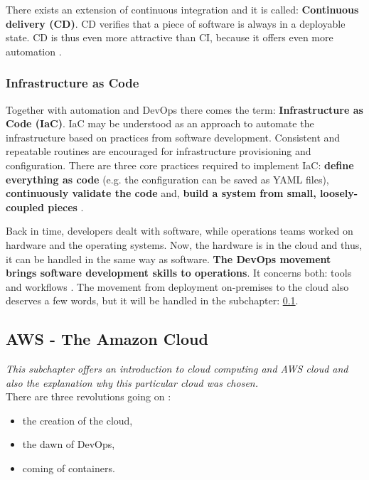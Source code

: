There exists an extension of continuous integration and it is called: \textbf{Continuous delivery (CD)}. CD verifies that a piece of software is always in a deployable state. CD is thus even more attractive than CI, because it offers even more automation \cite{online-do-cicd}.

\subsubsection{Infrastructure as Code}
Together with automation and DevOps there comes the term: \textbf{Infrastructure as Code (IaC)}. IaC may be understood as an approach to automate the infrastructure based on practices from software development. Consistent and repeatable routines are encouraged for infrastructure provisioning and configuration. There are three core practices required to implement IaC: \textbf{define everything as code} (e.g. the configuration can be saved as YAML files), \textbf{continuously validate the code} and, \textbf{build a system from small, loosely-coupled pieces} \cite{book-iac}.

Back in time, developers dealt with software, while operations teams worked on hardware and the operating systems. Now, the hardware is in the cloud and thus, it can be handled in the same way as software. \textbf{The DevOps movement brings software development skills to operations}. It concerns both: tools and workflows \cite{book-cndwk}. The movement from deployment on-premises to the cloud also deserves a few words, but it will be handled in the subchapter: \ref{section-aws}.

\subsection{AWS - The Amazon Cloud} \label{section-aws}
\textit{This subchapter offers an introduction to cloud computing and AWS cloud and also the explanation why this particular cloud was chosen.}
\\

There are three revolutions going on \cite{book-cndwk}:
\begin{itemize}
\item the creation of the cloud,
\item the dawn of DevOps,
\item coming of containers.
\end{itemize}

